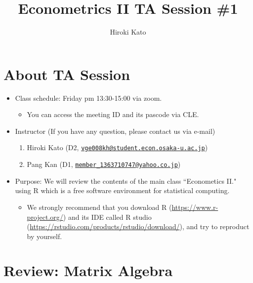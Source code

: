 \documentclass[
  12pt,
]{article}
\title{Econometrics II TA Session \#1}
\author{Hiroki Kato}
\date{}
\providecommand{\tightlist}{%
  \setlength{\itemsep}{0pt}\setlength{\parskip}{0pt}}
\begin{document}
\maketitle

\hypertarget{about-ta-session}{%
\section{About TA Session}\label{about-ta-session}}

\begin{itemize}
\tightlist
\item
  Class schedule: Friday pm 13:30-15:00 via zoom.

  \begin{itemize}
  \tightlist
  \item
    You can access the meeting ID and its pascode via CLE.
  \end{itemize}
\item
  Instructor (If you have any question, please contact us via e-mail)

  \begin{enumerate}
  \def\labelenumi{\arabic{enumi}.}
  \tightlist
  \item
    Hiroki Kato (D2,
    \href{mailto:vge008kh@student.econ.osaka-u.ac.jp}{\nolinkurl{vge008kh@student.econ.osaka-u.ac.jp}})
  \item
    Pang Kan (D1,
    \href{mailto:member_1363710747@yahoo.co.jp}{\nolinkurl{member\_1363710747@yahoo.co.jp}})
  \end{enumerate}
\item
  Purpose: We will review the contents of the main class ``Econometics
  II." using R which is a free software environment for statistical
  computing.

  \begin{itemize}
  \tightlist
  \item
    We strongly recommend that you download R
    (\url{https://www.r-project.org/}) and its IDE called R studio
    (\url{https://rstudio.com/products/rstudio/download/}), and try to
    reproduct by yourself.
  \end{itemize}
\end{itemize}

\hypertarget{review-matrix-algebra}{%
\section{Review: Matrix Algebra}\label{review-matrix-algebra}}
\end{document}
